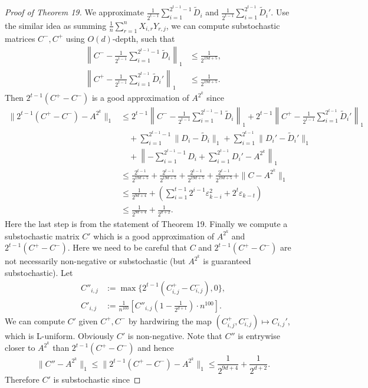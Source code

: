 \documentclass[10pt,a4paper]{article}
\begin{document}
\begin{proof}[Proof of Theorem 19]
We approximate $\frac1{2^{t-1}}\sum_{i=1}^{2^{t-1}-1}\widetilde D_i$ and $\frac1{2^{t-1}}\sum_{i=1}^{2^{t-1}}\widetilde D_i'$. Use the similar idea as summing $\frac1n\sum_{r=1}^n X_{i,r}Y_{r,j}$, we can compute substochastic matrices $C^-,C^+$ using $O(d)$-depth, such that
\begin{align*}\left\|C^--\frac1{2^{t-1}}\sum_{i=1}^{2^{t-1}-1}\widetilde D_i\right\|_1&\le\frac1{2^{19d+5}},\\\left\|C^+-\frac1{2^{t-1}}\sum_{i=1}^{2^{t-1}}\widetilde D_i'\right\|_1&\le\frac1{2^{19d+5}}.\end{align*}
Then $2^{t-1}(C^+-C^-)$ is a good approximation of $A^{2^k}$ since
\begin{align*}\|2^{t-1}(C^+-C^-)-A^{2^k}\|_1&\le2^{t-1}\left\|C^--\frac1{2^{t-1}}\sum_{i=1}^{2^{t-1}-1}\widetilde D_i\right\|_1+2^{t-1}\left\|C^+-\frac1{2^{t-1}}\sum_{i=1}^{2^{t-1}}\widetilde D_i'\right\|_1\\&\quad+\sum_{i=1}^{2^{t-1}-1}\|D_i-\widetilde D_i\|_1+\sum_{i=1}^{2^{t-1}}\|D_i'-\widetilde D_i'\|_1\\&\quad+\left\|-\sum_{i=1}^{2^{t-1}-1}D_i+\sum_{i=1}^{2^{t-1}}D_i'-A^{2^k}\right\|_1\\&\le\frac{2^{t-1}}{2^{19d+5}}+\frac{2^{t-1}}{2^{19d+5}}+\frac{2^{t-1}}{2^{19d+5}}+\frac{2^{t-1}}{2^{19d+5}}+\|C-A^{2^k}\|_1\\&\le\frac1{2^{9d+4}}+\left(\sum_{i=1}^{t-1}2^{i-1}\varepsilon_{k-i}^2+2^t\varepsilon_{k-t}\right)\\&\le\frac1{2^{9d+4}}+\frac1{2^{d+2}}.\end{align*}
Here the last step is from the statement of Theorem 19.
Finally we compute a substochastic matrix $C'$ which is a good approximation of $A^{2^k}$ and $2^{t-1}(C^+-C^-)$. Here we need to be careful that $C$ and $2^{t-1}(C^+-C^-)$ are not necessarily non-negative or substochastic (but $A^{2^k}$ is guaranteed substochastic). Let
\begin{align*}C''_{i,j}&:=\max\{2^{t-1}(C_{i,j}^+-C_{i,j}^-),0\},\\C'_{i,j}&:=\frac1{n^{100}}\left[C''_{i,j}\left(1-\frac1{2^{d+1}}\right)\cdot n^{100}\right].\end{align*}
We can compute $C'$ given $C^+,C^-$ by hardwiring the map $(C_{i,j}^+,C_{i,j}^-)\mapsto C_{i,j}'$, which is L-uniform. Obviously $C'$ is non-negative. Note that $C''$ is entrywise closer to $A^{2^k}$ than $2^{t-1}(C^+-C^-)$ and hence
\[\|C''-A^{2^k}\|_1\le\|2^{t-1}(C^+-C^-)-A^{2^k}\|_1\le\frac1{2^{9d+4}}+\frac1{2^{d+2}}.\]
Therefore $C'$ is substochastic since

\end{proof}
\end{document}
